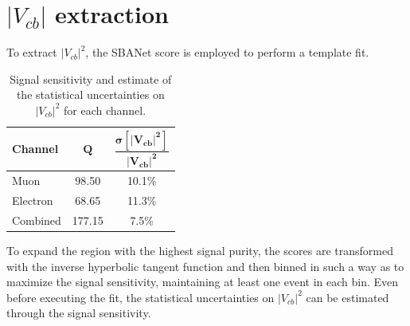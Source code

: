 \section{$|V_{cb}|$ extraction}
To extract $|V_{cb}|^2$, the SBANet score is employed to perform a template fit.

\begin{minipage}{\linewidth}
\begin{minipage}{0.43\linewidth}
\begin{table}[H]
    \centering
    \begin{tabular}{l|cc}
    \toprule
        \textbf{Channel} & $\bm{Q}$ & $\dfrac{\bm{\sigma[|V_{cb}|^2]}}{\bm{|V_{cb}|^2}}$ \\
        \midrule
         Muon & 98.50 & 10.1\%\\
         Electron & 68.65 &  11.3\%\\
         Combined & 177.15 & 7.5\%\\
         \bottomrule
    \end{tabular}
    \caption{Signal sensitivity and estimate of the statistical uncertainties on $|V_{cb}|^2$ for each channel.}
    \label{tab:stat_unc}
\end{table}
    
\end{minipage}
\hfill
\begin{minipage}{0.52\linewidth}
    To expand the region with the highest signal purity, the scores are transformed with the inverse hyperbolic tangent function and then binned in such a way as to maximize the signal sensitivity, maintaining at least one event in each bin.
    Even before executing the fit, the statistical uncertainties on $|V_{cb}|^2$ can be estimated through the signal sensitivity.
\end{minipage}

    
\end{minipage}

